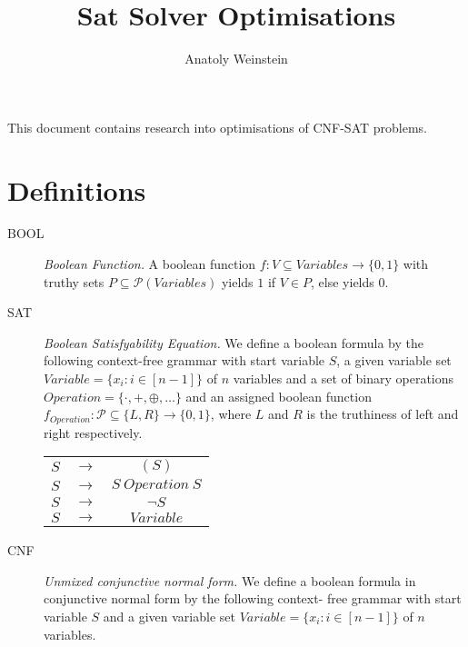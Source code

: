 \documentclass[12pt, letterpaper]{article}
\title{Sat Solver Optimisations}
\author{Anatoly Weinstein}
\begin{document}
    \maketitle

    This document contains research into optimisations of CNF-SAT problems.

    \section{Definitions}

    \begin{description}
        \item[BOOL] {
            \emph{Boolean Function.}
            A boolean function $f: V \subseteq Variables \rightarrow
            \{0, 1\}$ with truthy sets $P \subseteq \mathcal{P}(Variables)$
            yields $1$ if $V \in P$, else yields $0$.
        }
        \item[SAT] {
            \emph{Boolean Satisfyability Equation.}
            We define a boolean formula by the following context-free
            grammar with start variable $S$, a given variable set
            $Variable = \{x_i : i \in [n-1]\}$ of $n$ variables and a
            set of binary operations $Operation = \{\cdot, +, \oplus,
            \dots\}$ and an assigned boolean function $f_{Operation}
            : \mathcal{P} \subseteq \{L, R\} \rightarrow \{0, 1\}$,
            where $L$ and $R$ is the truthiness of left and right 
            respectively.

            \begin{tabular}{ccc}
                $S$ & $\rightarrow$& $(S)$ \\ 
                $S$ & $\rightarrow$& $S\ Operation\ S$ \\ 
                $S$ & $\rightarrow$& $\lnot S$ \\ 
                $S$ & $\rightarrow$& $Variable$ \\ 
            \end{tabular}
        }
        \item[CNF] {
            \emph{Unmixed conjunctive normal form.} We define a boolean
            formula in conjunctive normal form by the following context-
            free grammar with start variable $S$ and a given variable
            set $Variable = \{x_i : i \in [n-1]\}$ of $n$ variables.

}
\end{description}
\end{document}
